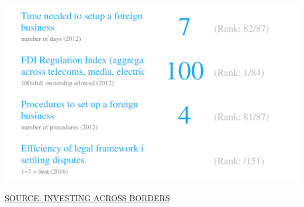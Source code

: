 \documentclass{article}\usepackage[]{graphicx}\usepackage[]{color}
\makeatletter
\def\maxwidth{ %
  \ifdim\Gin@nat@width>\linewidth
    \linewidth
  \else
    \Gin@nat@width
  \fi
}
\makeatother
\begin{document}
\begin{minipage}[c]{0.95\textwidth}
\begin{minipage}[c]{0.43\textwidth}
{\centering \includegraphics[width=\maxwidth]{figure/number_chart_Policy-1} 

}



    \vspace{-1ex}
    \scriptsize{\href{http://iab.worldbank.org/Data/ExploreTopics/Investing-across-sectors}{\textcolor[HTML]{22A6F5}{SOURCE: INVESTING ACROSS BORDERS}}}
  \end{minipage}
\end{minipage}
\end{document}
